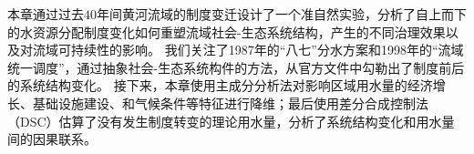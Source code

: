 

本章通过过去$40$年间黄河流域的制度变迁设计了一个准自然实验，分析了自上而下的水资源分配制度变化如何重塑流域社会-生态系统结构，产生的不同治理效果以及对流域可持续性的影响。
我们关注了1987年的“八七”分水方案和1998年的“流域统一调度”，通过抽象社会-生态系统构件的方法，从官方文件中勾勒出了制度前后的系统结构变化。
接下来，本章使用主成分分析法对影响区域用水量的经济增长、基础设施建设、和气候条件等特征进行降维；最后使用差分合成控制法（DSC）\cite{arkhangelsky2021}估算了没有发生制度转变的理论用水量，分析了系统结构变化和用水量间的因果联系。
